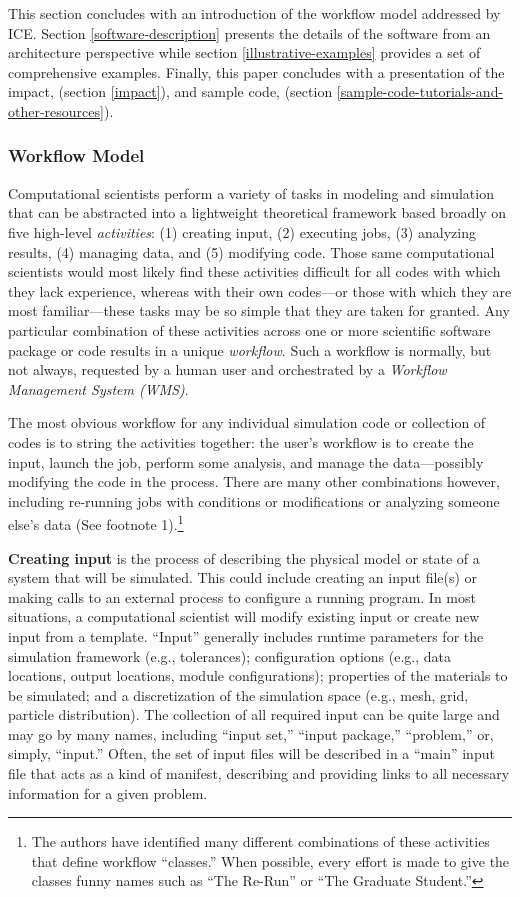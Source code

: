 This section concludes with an introduction of the workflow model addressed by
ICE. Section \ref{software-description} presents the details of the software
from an architecture perspective while section \ref{illustrative-examples}
provides a set of comprehensive examples. Finally, this paper concludes with a
presentation of the impact, (section \ref{impact}), and sample code,
(section \ref{sample-code-tutorials-and-other-resources}).

\subsubsection{Workflow Model}\label{workflow-model}

Computational scientists perform a variety of tasks in modeling and
simulation that can be abstracted into a lightweight theoretical
framework based broadly on five high-level \emph{activities}: (1)
creating input, (2) executing jobs, (3) analyzing results, (4) managing
data, and (5) modifying code. Those same computational scientists would
most likely find these activities difficult for all codes with which
they lack experience, whereas with their own codes---or those with which
they are most familiar---these tasks may be so simple that they are
taken for granted. Any particular combination of these activities across
one or more scientific software package or code results in a unique
\emph{workflow}. Such a workflow is normally, but not always, requested
by a human user and orchestrated by a \emph{Workflow Management System
(WMS)}.

The most obvious workflow for any individual simulation code or
collection of codes is to string the activities together: the user's
workflow is to create the input, launch the job, perform some analysis,
and manage the data---possibly modifying the code in the process. There
are many other combinations however, including re-running jobs with
conditions or modifications or analyzing someone else's data (See
footnote 1).\footnote{The
authors have identified many different combinations of these activities that
define workflow ``classes.'' When possible, every effort is made to give the
classes funny names such as ``The Re-Run'' or ``The Graduate Student.''}

\textbf{Creating input} is the process of describing the physical model
or state of a system that will be simulated. This could include creating
an input file(s) or making calls to an external process to configure a
running program. In most situations, a computational scientist will
modify existing input or create new input from a template. ``Input''
generally includes runtime parameters for the simulation framework
(e.g., tolerances); configuration options (e.g., data locations, output
locations, module configurations); properties of the materials to be
simulated; and a discretization of the simulation space (e.g., mesh,
grid, particle distribution). The collection of all required input can
be quite large and may go by many names, including ``input set,''
``input package,'' ``problem,'' or, simply, ``input.'' Often, the set of
input files will be described in a ``main'' input file that acts as a
kind of manifest, describing and providing links to all necessary
information for a given problem.

